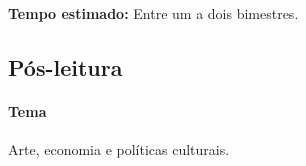 \documentclass[12pt]{extarticle}
\begin{document}
\textbf{Tempo estimado:} Entre um a dois bimestres.

\subsection{Pós-leitura}

\paragraph{Tema} Arte, economia e políticas culturais.

\end{document}
